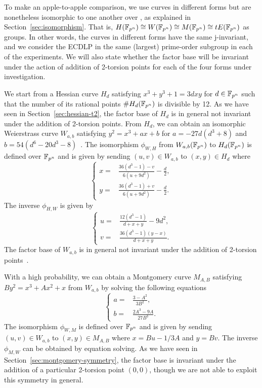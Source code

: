 %
%


%
To make an apple-to-apple comparison, we use curves in different forms
but are nonetheless isomorphic to one another over , as
explained in Section~\ref{sec:isomorphism}.
%
That is, $H(\mathbb F_{p^n})\cong W(\mathbb F_{p^n})\cong M(\mathbb F_{p^n})\cong tE(\mathbb F_{p^n})$
as groups.
%
In other words, the curves in different forms have the same
j-invariant, and we consider the ECDLP in the same (largest)
prime-order subgroup in each of the experiments.
%
We will also state whether the factor base will be invariant under the
action of addition of 2-torsion points for each of the four forms
under investigation.

We start from a Hessian curve $H_d$ satisfying $x^3 + y^3 + 1 = 3dxy$
for $d\in\mathbb F_{p^n}$ such that the number of its rational points
$\#H_d(\mathbb F_{p^n})$ is divisible by 12.
%
As we have seen in Section~\ref{sec:hessian-t2}, the factor base of $H_d$
is in general not invariant under the addition of 2-torsion points.
%
From $H_d$, we can obtain an isomorphic Weierstrass curve $W_{a,b}$
satisfying $y^2 = x^3 + ax + b$ for $a = - 27d(d^3 + 8)$ and
$b = 54(d^6 - 20d^3 - 8)$~\cite{DBLP:conf/ches/Smart01}.
%
The isomorphism $\phi_{W,H}$ from $W_{a,b}(\mathbb F_{p^n})$ to $H_d(\mathbb F_{p^n})$
is defined over $\mathbb F_{p^n}$ and is given by sending $(u,v)\in W_{a,b}$
to $(x,y)\in H_d$ where
\[ \left\{\begin{aligned}
x = & \frac{36(d^3 - 1) - v}{6(u + 9d^2)} - \frac{d}{2}, \\
y = & \frac{36(d^3 - 1) + v}{6(u + 9d^2)} - \frac{d}{2}.
\end{aligned}\right. \]
%
The inverse $\phi_{H,W}$ is given by
\[ \left\{\begin{aligned}
u = & \frac{12(d^3 - 1)}{d + x + y} - 9d^2, \\
v = & \frac{36(d^3 - 1)(y - x)}{d + x + y}.
\end{aligned}\right. \]
%
The factor base of $W_{a,b}$ is in general not invariant under the
addition of 2-torsion points~\cite{DBLP:journals/joc/FaugereGHR14}.

With a high probability, we can obtain a Montgomery curve $M_{A,B}$
satisfying $By^2 = x^3 + Ax^2 + x$ from $W_{a,b}$ by solving the
following equations
%
\[ \left\{\begin{aligned}
a = & \frac{3 - A^2}{3B^2}, \\
b = & \frac{2A^3 - 9A}{27B^3}.
\end{aligned}\right. \]
%
The isomorphism $\phi_{W,M}$ is defined over
$\mathbb F_{p^n}$ and is given by sending $(u,v)\in W_{a,b}$ to
$(x,y)\in M_{A,B}$ where $x = Bu - 1/3A$ and $y = Bv$.
%
The inverse $\phi_{M,W}$ can be obtained by equation solving.
%
As we have seen in Section~\ref{sec:montgomery-symmetry}, the factor
base is invariant under the addition of a particular 2-torsion point
$(0,0)$, though we are not able to exploit this symmetry in general.

